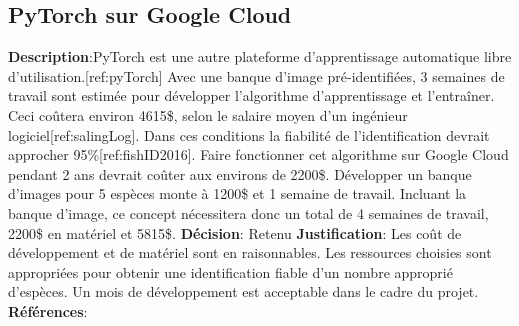 

\subsection{PyTorch sur Google Cloud}
\label{s:identifier_conc3}

\textbf{Description}:PyTorch est une autre plateforme d’apprentissage automatique libre d’utilisation.[ref:pyTorch]  Avec une banque d’image pré-identifiées, 3 semaines de travail sont estimée pour développer l'algorithme d’apprentissage et l’entraîner. Ceci coûtera environ 4615\$, selon le salaire moyen d’un ingénieur logiciel[ref:salingLog]. Dans ces conditions la fiabilité de l’identification devrait approcher 95\%[ref:fishID2016]. Faire fonctionner cet algorithme sur Google Cloud pendant 2 ans devrait coûter aux environs de 2200\$. Développer un banque d’images pour 5 espèces monte à 1200\$ et 1 semaine de travail. Incluant la banque d’image, ce concept nécessitera donc un total de 4 semaines de travail, 2200\$ en matériel et 5815\$.
\textbf{Décision}: Retenu
\textbf{Justification}: Les coût de développement et de matériel sont en raisonnables. Les ressources choisies sont appropriées pour obtenir une identification fiable d’un nombre approprié d’espèces. Un mois de développement est acceptable dans le cadre du projet.
\textbf{Références}:
\cite{pytorch, googCloud, fishID_2016, sal_ingLog} 	